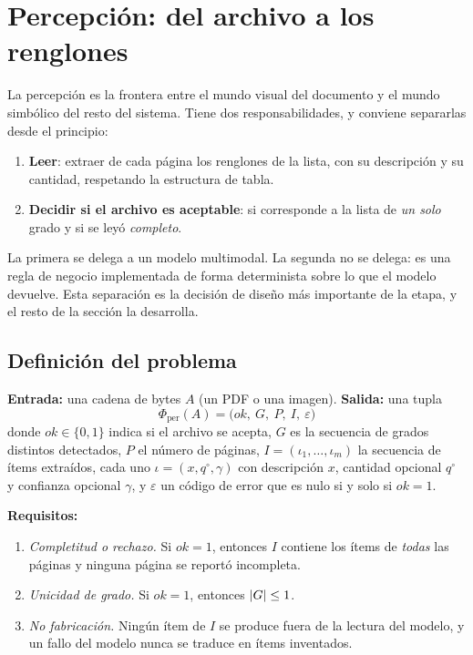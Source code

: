 \section{Percepción: del archivo a los renglones}
\label{sec:percepcion}

La percepción es la frontera entre el mundo visual del documento y el mundo
simbólico del resto del sistema. Tiene dos responsabilidades, y conviene
separarlas desde el principio:

\begin{enumerate}
  \item \textbf{Leer}: extraer de cada página los renglones de la lista, con su
        descripción y su cantidad, respetando la estructura de tabla.
  \item \textbf{Decidir si el archivo es aceptable}: si corresponde a la lista
        de \emph{un solo} grado y si se leyó \emph{completo}.
\end{enumerate}

La primera se delega a un modelo multimodal. La segunda no se delega: es una
regla de negocio implementada de forma determinista sobre lo que el modelo
devuelve. Esta separación es la decisión de diseño más importante de la
etapa, y el resto de la sección la desarrolla.

\subsection{Definición del problema}

\begin{definicion}
\label{def:percepcion}
\textbf{Entrada:} una cadena de bytes $A$ (un PDF o una imagen).
\textbf{Salida:} una tupla
\[
  \Phi_{\mathrm{per}}(A) = \bigl(\mathit{ok},\ G,\ P,\ I,\ \varepsilon\bigr)
\]
donde $\mathit{ok}\in\{0,1\}$ indica si el archivo se acepta, $G$ es la
secuencia de grados distintos detectados, $P$ el número de páginas,
$I=(\iota_1,\dots,\iota_m)$ la secuencia de ítems extraídos, cada uno
$\iota=(x,q^\circ,\gamma)$ con descripción $x$, cantidad opcional $q^\circ$ y
confianza opcional $\gamma$, y $\varepsilon$ un código de error que es nulo si
y solo si $\mathit{ok}=1$.

\noindent\textbf{Requisitos:}
\begin{enumerate}[label=(R\arabic*)]
  \item\label{req:completo} \emph{Completitud o rechazo.} Si
        $\mathit{ok}=1$, entonces $I$ contiene los ítems de \emph{todas} las
        páginas y ninguna página se reportó incompleta.
  \item\label{req:grado} \emph{Unicidad de grado.} Si $\mathit{ok}=1$,
        entonces $\left\lvert G \right\rvert\leq 1$.
  \item\label{req:nofab} \emph{No fabricación.} Ningún ítem de $I$ se
        produce fuera de la lectura del modelo, y un fallo del modelo nunca se
        traduce en ítems inventados.
\end{enumerate}
\end{definicion}

